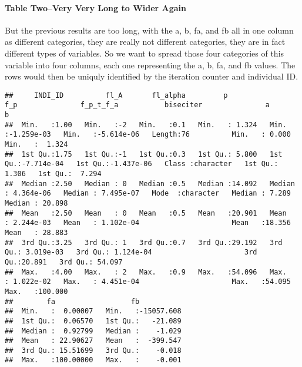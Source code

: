 \documentclass[
]{book}
\newenvironment{Shaded}{\begin{snugshade}}{\end{snugshade}}
\newcommand{\CommentTok}[1]{\textcolor[rgb]{0.56,0.35,0.01}{\textit{#1}}}
\newcommand{\DataTypeTok}[1]{\textcolor[rgb]{0.13,0.29,0.53}{#1}}
\newcommand{\KeywordTok}[1]{\textcolor[rgb]{0.13,0.29,0.53}{\textbf{#1}}}
\newcommand{\NormalTok}[1]{#1}
\newcommand{\OperatorTok}[1]{\textcolor[rgb]{0.81,0.36,0.00}{\textbf{#1}}}
\newcommand{\StringTok}[1]{\textcolor[rgb]{0.31,0.60,0.02}{#1}}
\begin{document}
\hypertarget{table-twovery-very-long-to-wider-again}{%
\paragraph{Table Two--Very Very Long to Wider Again}\label{table-twovery-very-long-to-wider-again}}

But the previous results are too long, with the a, b, fa, and fb all in one column as different categories, they are really not different categories, they are in fact different types of variables. So we want to spread those four categories of this variable into four columns, each one representing the a, b, fa, and fb values. The rows would then be uniquly identified by the iteration counter and individual ID.

\begin{Shaded}
\end{Shaded}

\begin{verbatim}
##     INDI_ID          fl_A       fl_alpha         p               f_p               f_p_t_f_a           biseciter               a                b          
##  Min.   :1.00   Min.   :-2   Min.   :0.1   Min.   : 1.324   Min.   :-1.259e-03   Min.   :-5.614e-06   Length:76          Min.   : 0.000   Min.   :  1.324  
##  1st Qu.:1.75   1st Qu.:-1   1st Qu.:0.3   1st Qu.: 5.800   1st Qu.:-7.714e-04   1st Qu.:-1.437e-06   Class :character   1st Qu.: 1.306   1st Qu.:  7.294  
##  Median :2.50   Median : 0   Median :0.5   Median :14.092   Median : 4.364e-06   Median : 7.495e-07   Mode  :character   Median : 7.289   Median : 20.898  
##  Mean   :2.50   Mean   : 0   Mean   :0.5   Mean   :20.901   Mean   : 2.244e-03   Mean   : 1.102e-04                      Mean   :18.356   Mean   : 28.883  
##  3rd Qu.:3.25   3rd Qu.: 1   3rd Qu.:0.7   3rd Qu.:29.192   3rd Qu.: 3.019e-03   3rd Qu.: 1.124e-04                      3rd Qu.:20.891   3rd Qu.: 54.097  
##  Max.   :4.00   Max.   : 2   Max.   :0.9   Max.   :54.096   Max.   : 1.022e-02   Max.   : 4.451e-04                      Max.   :54.095   Max.   :100.000  
##        fa                  fb            
##  Min.   :  0.00007   Min.   :-15057.608  
##  1st Qu.:  0.06570   1st Qu.:   -21.089  
##  Median :  0.92799   Median :    -1.029  
##  Mean   : 22.90627   Mean   :  -399.547  
##  3rd Qu.: 15.51699   3rd Qu.:    -0.018  
##  Max.   :100.00000   Max.   :    -0.001
\end{verbatim}
\end{document}
